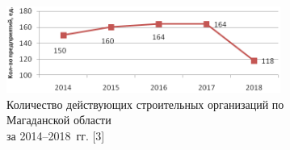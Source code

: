 \begin{figure}[H]

  \begin{center}
    \includegraphics[width=0.8\textwidth]{authors/serebryakova-fig-1.png}
  \end{center}

  \caption{Количество действующих строительных организаций по Магаданской
области\\за 2014--2018~гг. [3]}
  \label{fig:serebryakova-fig-1}
\end{figure}
